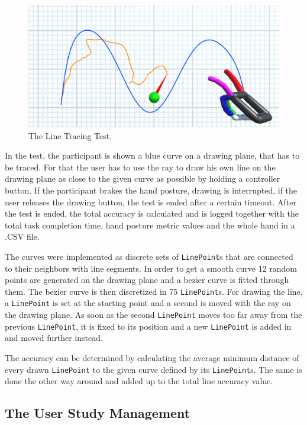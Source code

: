 \begin{figure}
\centering
\includegraphics[width=\textwidth]{linetracing}
\caption{The Line Tracing Test.}
\label{fig:line}
\end{figure}

In the test, the participant is shown a blue curve on a drawing plane, that has to be traced. For that the user has to use the ray to draw his own line on the drawing plane as close to the given curve as possible by holding a controller button. If the participant brakes the hand posture, drawing is interrupted, if the user releases the drawing button, the test is ended after a certain timeout.
After the test is ended, the total accuracy is calculated and is logged together with the total task completion time, hand posture metric values and the whole hand in a .CSV file.

The curves were implemented as discrete sets of \texttt{LinePoint}s that are connected to their neighbors with line segments. In order to get a smooth curve 12 random points are generated on the drawing plane and a bezier curve is fitted through them. The bezier curve is then discretized in 75 \texttt{LinePoint}s. For drawing the line, a \texttt{LinePoint} is set at the starting point and a second is moved with the ray on the drawing plane. As soon as the second \texttt{LinePoint} moves too far away from the previous \texttt{LinePoint}, it is fixed to its position and a new \texttt{LinePoint} is added in and moved further instead.

The accuracy can be determined by calculating the average minimum distance of every drawn \texttt{LinePoint} to the given curve defined by its \texttt{LinePoint}s. The same is done the other way around and added up to the total line accuracy value. 

\subsection{The User Study Management}

